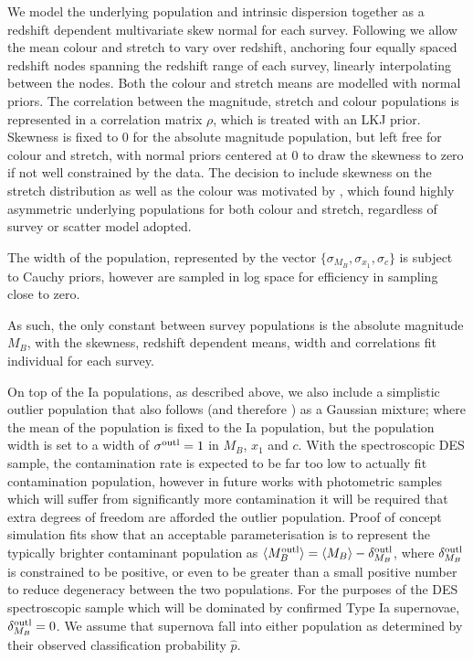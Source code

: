 \documentclass[a4paper,fleqn,usenatbib]{mnras}
\newcommand{\rubin}{\citetalias{Rubin2015}}
\begin{document}
We model the underlying population and intrinsic dispersion together as a redshift dependent multivariate skew normal for each survey. Following {\rubin} we allow the mean colour and stretch to vary over redshift, anchoring four equally spaced redshift nodes spanning the redshift range of each survey, linearly interpolating between the nodes. Both the colour and stretch means are modelled with normal priors. The correlation between the magnitude, stretch and colour populations is represented in a correlation matrix $\rho$, which is treated with an LKJ prior. Skewness is fixed to 0 for the absolute magnitude population, but left free for colour and stretch, with normal priors centered at 0 to draw the skewness to zero if not well constrained by the data. The decision to include skewness on the stretch distribution as well as the colour was motivated by \citet{Scolnic2016}, which found highly asymmetric underlying populations for both colour and stretch, regardless of survey or scatter model adopted.

The width of the population, represented by the vector $\lbrace \sigma_{M_B}, \sigma_{x_1}, \sigma_c \rbrace$ is subject to Cauchy priors, however are sampled in log space for efficiency in sampling close to zero. 


As such, the only constant between survey populations is the absolute magnitude $M_B$, with the skewness, redshift dependent means, width and correlations fit individual for each survey.

On top of the Ia populations, as described above, we also include a simplistic outlier population that also follows {\rubin} (and therefore \citet{Kunz2007}) as a Gaussian mixture; where the mean of the population is fixed to the Ia population, but the population width is set to a width of $\sigma^{\rm outl} = 1$ in $M_B$, $x_1$ and $c$. With the spectroscopic DES sample, the contamination rate is expected to be far too low to actually fit contamination population, however in future works with photometric samples which will suffer from significantly more contamination it will be required that extra degrees of freedom are afforded the outlier population. Proof of concept simulation fits show that an acceptable parameterisation is to represent the typically brighter contaminant population as $\langle M_B^{\rm outl} \rangle = \langle M_B \rangle - \delta_{M_B}^{\rm outl}$, where $\delta_{M_B}^{\rm outl}$ is constrained to be positive, or even to be greater than a small positive number to reduce degeneracy between the two populations. For the purposes of the DES spectroscopic sample which will be dominated by confirmed Type Ia supernovae, $\delta_{M_B}^{\rm outl} =0$. We assume that supernova fall into either population as determined by their observed classification probability $\hat{p}$.
\end{document}
